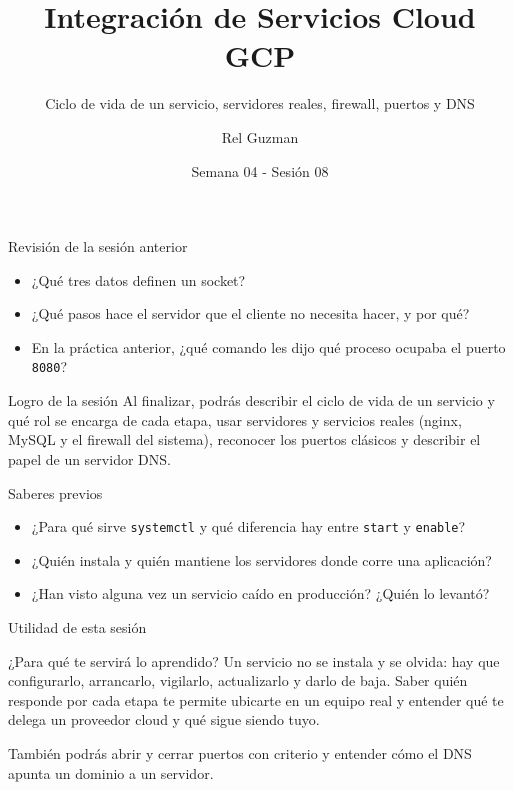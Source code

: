 \documentclass[aspectratio=169,10pt,c]{beamer}
\title{Integración de Servicios Cloud GCP}
\subtitle{Ciclo de vida de un servicio, servidores reales, firewall, puertos y DNS}
\date{Semana 04 - Sesión 08}
\author{Rel Guzman}
\begin{document}
{\maketitle}

\begin{frame}{Revisión de la sesión anterior}
\begin{itemize}\setlength\itemsep{10pt}
  \item ¿Qué tres datos definen un socket?
  \item ¿Qué pasos hace el servidor que el cliente no necesita hacer, y por qué?
  \item En la práctica anterior, ¿qué comando les dijo qué proceso ocupaba el puerto \texttt{8080}?
\end{itemize}
\end{frame}

\begin{frame}[c]
\begin{block}{Logro de la sesión}
Al finalizar, podrás describir el ciclo de vida de un servicio y qué rol se encarga de cada etapa, usar servidores y servicios reales (nginx, MySQL y el firewall del sistema), reconocer los puertos clásicos y describir el papel de un servidor DNS.
\end{block}
\end{frame}

\begin{frame}{Saberes previos}
\begin{itemize}\setlength\itemsep{10pt}
  \item ¿Para qué sirve \texttt{systemctl} y qué diferencia hay entre \texttt{start} y \texttt{enable}?
  \item ¿Quién instala y quién mantiene los servidores donde corre una aplicación?
  \item ¿Han visto alguna vez un servicio caído en producción? ¿Quién lo levantó?
\end{itemize}
\end{frame}

\begin{frame}{Utilidad de esta sesión}
\begin{block}{¿Para qué te servirá lo aprendido?}
Un servicio no se instala y se olvida: hay que configurarlo, arrancarlo, vigilarlo, actualizarlo y darlo de baja. Saber quién responde por cada etapa te permite ubicarte en un equipo real y entender qué te delega un proveedor cloud y qué sigue siendo tuyo.
\end{block}
\vspace{0.2cm}
\small También podrás abrir y cerrar puertos con criterio y entender cómo el DNS apunta un dominio a un servidor.
\end{frame}
\end{document}
